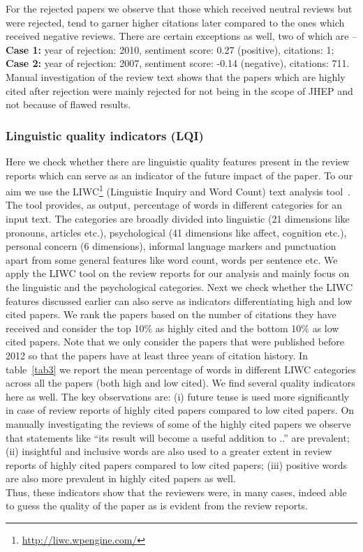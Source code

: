 For the rejected papers we observe that those which received neutral reviews but were rejected, tend to garner higher citations later compared to the ones which received negative reviews. There are certain exceptions as well, two of which are -- {\bf Case 1:} year of rejection: 2010, sentiment score: 0.27 (positive), citations: 1; {\bf Case 2:} year of rejection: 2007, sentiment score: -0.14 (negative), citations: 711.
Manual investigation of the review text shows that the papers which are highly cited after rejection were mainly rejected for not being in the scope of JHEP and not because of flawed results. 

\subsubsection*{Linguistic quality indicators (LQI)}

Here we check whether there are linguistic quality features present in the review reports which can serve as an indicator of the future impact of the paper. To our aim we use the LIWC\footnote{\url{http://liwc.wpengine.com/}} (Linguistic Inquiry and Word Count) text analysis tool~\cite{pennebaker2007development}. The tool provides, as output, percentage of words in different categories for an input text. The categories are broadly divided into linguistic (21 dimensions like pronouns, articles etc.), psychological (41 dimensions like affect, cognition etc.), personal concern (6 dimensions), informal language markers and punctuation apart from some general features like word count, words per sentence etc. We apply the LIWC tool on the review reports for our analysis and mainly focus on the linguistic and the psychological categories.
Next we check whether the LIWC features discussed earlier can also serve as indicators differentiating high and low cited papers. We rank the papers based on the number of citations they have received and consider the top 10\% as highly cited and the bottom 10\% as low cited papers. Note that we only consider the papers that were published before 2012 so that the papers have at least three years of citation history. In table~\ref{tab3} we report the mean percentage of words in different LIWC categories across all the papers (both high and low cited). We find several quality indicators here as well. The key observations are: (i) future tense is used more significantly in case of review reports of highly cited papers compared to low cited papers. On manually investigating the reviews of some of the highly cited papers we observe that statements like ``its result will become a useful addition to ..'' are prevalent; (ii) insightful and inclusive words are also used to a greater extent in review reports of highly cited papers compared to low cited papers; (iii) positive words are also more prevalent in highly cited papers as well.\\
Thus, these indicators show that the reviewers were, in many cases, indeed able to guess the quality of the paper as is evident from the review reports.



